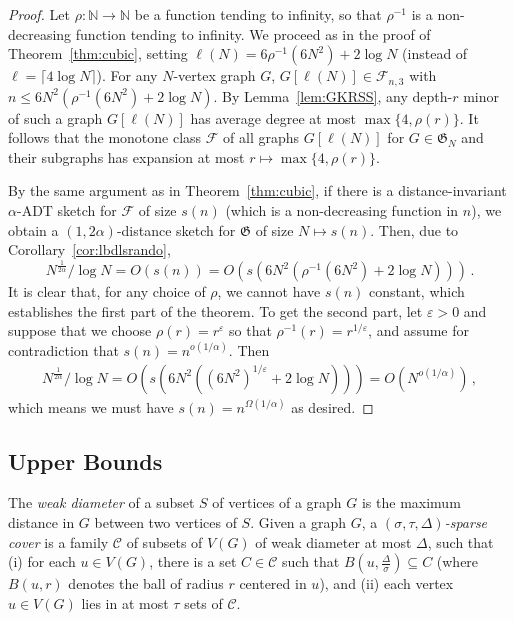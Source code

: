 \documentclass[11pt]{article}
\theoremstyle{definition}
\newcommand{\eps}{\varepsilon}
\renewcommand{\leq}{\leqslant}
\def\F {{\mathcal F}}
\def\fG{{\mathfrak G}}
\def\bN{{\mathbb N}}
\begin{document}
\begin{proof}
Let $\rho : \bN \to \bN$ be a function tending to infinity, so that $\rho^{-1}$ is a non-decreasing
function tending to infinity. We proceed as in the proof of Theorem~\ref{thm:cubic}, setting
$\ell(N) = 6 \rho^{-1}(6N^2) + 2\log N$ (instead of $\ell = \lceil 4 \log N \rceil$). For any
$N$-vertex graph $G$, $G[\ell(N)] \in \F_{n,3}$ with $n \leq 6N^2(\rho^{-1}(6N^2) + 2 \log N)$. By
Lemma~\ref{lem:GKRSS}, any depth-$r$ minor of such a graph $G[\ell(N)]$ has average degree at most
$\max\{4, \rho(r)\}$. It follows that the monotone class $\F$ of all graphs $G[\ell(N)]$ for $G \in
\fG_N$ and their subgraphs has expansion at most $r \mapsto \max\{4,\rho(r)\}$.

By the same argument as in Theorem~\ref{thm:cubic}, if there is a distance-invariant $\alpha$-ADT
sketch for $\F$ of size $s(n)$ (which is a non-decreasing function in $n$), we obtain a
$(1,2\alpha)$-distance sketch for $\fG$ of size $N \mapsto s(n)$. Then, due to
Corollary~\ref{cor:lbdlsrando},
\[
N^{\tfrac{1}{2\alpha}} / \log N = O\left(s(n)\right) = O\left( s \left( 6N^2(\rho^{-1}(6N^2) + 2
\log N) \right)\right) \,.
\]
It is clear that, for any choice of $\rho$, we cannot have $s(n)$ constant, which establishes the
first part of the theorem. To get the second part, let $\eps > 0$ and suppose that we choose
$\rho(r) = r^\eps$ so that $\rho^{-1}(r) = r^{1/\eps}$, and assume for contradiction that
$s(n) = n^{o(1/\alpha)}$. Then
\begin{align*}
N^{\tfrac{1}{2\alpha}} / \log N
  = O\left( s\left( 6N^2((6N^2)^{1/\eps} + 2\log N)\right) \right)
  = O\left( N^{o(1/\alpha)} \right) \,,
\end{align*}
which means we must have $s(n) = n^{\Omega(1/\alpha)}$ as desired.
\end{proof}

\subsection{Upper Bounds}
\label{sec:upperbounds}
The \emph{weak diameter} of a subset $S$ of vertices of a graph $G$ is
the maximum distance in $G$ between two vertices of $S$.
Given a graph $G$, a \emph{$(\sigma, \tau, \Delta)$-sparse cover} is a family
$\mathcal{C}$ of
subsets of $V(G)$ of weak diameter at most $\Delta$, such that (i) for each $u\in V(G)$, there is a set
$C\in \mathcal{C}$ such that $B(u,\tfrac{\Delta}{\sigma})\subseteq C$ (where
$B(u,r)$ denotes the ball of radius $r$ centered in $u$), and (ii)
each vertex $u\in V(G)$ lies in at most $\tau$ sets of $\mathcal{C}$.
\end{document}
